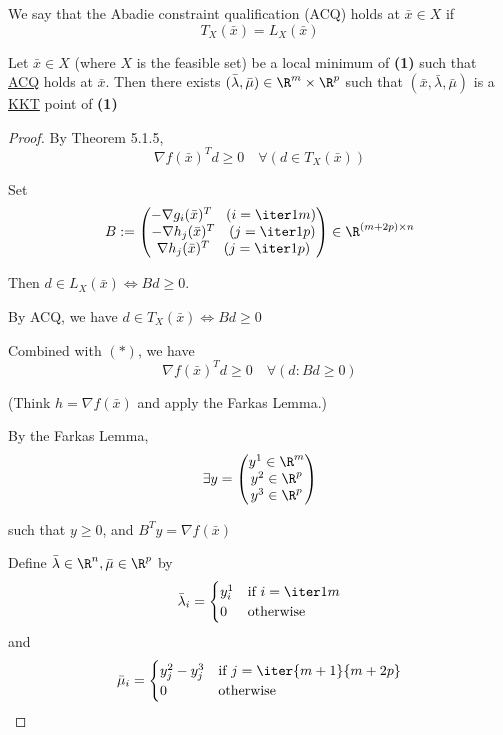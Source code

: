 \label{adc266e}

We say that the Abadie constraint qualification (ACQ) holds at $\bar
	x\in X$ if
$$
	T_X(\bar x)=L_X(\bar x)
$$

\label{b1c5437}

Let $\bar x\in X$ (where $X$ is the feasible set) be a local minimum
of \textbf{(1)} such that \hyperref[adc266e]{ACQ} holds at $\bar x$.
Then there exists $(\bar\lambda,\bar\mu)\in\R^m\times\R^p$ such that
$(\bar x,\bar\lambda,\bar\mu)$ is a \hyperref[b38093d]{KKT} point of
\textbf{(1)}

\begin{proof}
	\def\bm{\bar\mu}\def\bl{\bar\lambda}\def\bx{\bar x}
	By Theorem 5.1.5,
	\begin{equation*}
		\nabla f(\bx)^Td\geq0\quad\forall(d\in T_X(\bx))\tag*{($*$)}
	\end{equation*}

	Set
	$$
		B:=\begin{pmatrix}
			-\nabla g_i(\bx)^T\quad(i=\iter1m) \\
			-\nabla h_j(\bx)^T\quad(j=\iter1p) \\
			\nabla h_j(\bx)^T\quad(j=\iter1p)
		\end{pmatrix}\in\R^{(m+2p)\times{n}}
	$$

	Then $d\in L_X(\bx)\iff Bd\geq0$.

	By ACQ, we have $d\in T_X(\bx)\iff Bd\geq0$

	Combined with $(*)$, we have
	$$
		\nabla f(\bx)^Td\geq0\quad\forall(d:Bd\geq0)
	$$

	(Think $h=\nabla f(\bx)$ and apply the Farkas Lemma.)

	By the Farkas Lemma,
	$$
		\exists y=\begin{pmatrix}y^1\in\R^m\\y^2\in\R^p\\y^3\in\R^p\end{pmatrix}
	$$

	such that $y\geq0$, and $B^Ty=\nabla f(\bx)$

	Define $\bl\in\R^n,\bm\in\R^p$ by
	$$
		\bl_i=\begin{cases}
			y^1_i & \text{if $i=\iter1m$} \\
			0     & \text{otherwise}
		\end{cases}
	$$
	and
	$$
		\bm_i=\begin{cases}
			y^2_j - y^3_j & \text{if $j=\iter{m+1}{m+2p}$} \\
			0             & \text{otherwise}
		\end{cases}
	$$


\end{proof}
